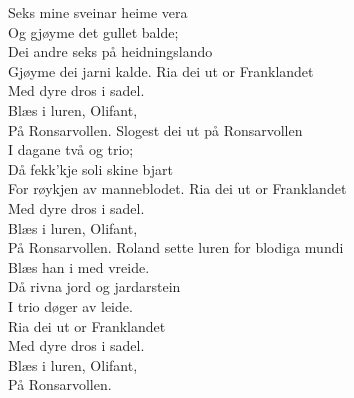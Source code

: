 
Seks mine sveinar heime vera\\
Og gjøyme det gullet balde;\\
Dei andre seks på heidningslando\\
Gjøyme dei jarni kalde.
\hops
{} Ria dei ut or Franklandet\\
 Med dyre dros i sadel.\\
 Blæs i luren, Olifant,\\
 På Ronsarvollen.
\hops
Slogest dei ut på Ronsarvollen\\
I dagane två og trio;\\
Då fekk'kje soli skine bjart\\
For røykjen av manneblodet.
\hops
{} Ria dei ut or Franklandet\\
 Med dyre dros i sadel.\\
 Blæs i luren, Olifant,\\
 På Ronsarvollen.
\hops
Roland sette luren for blodiga mundi\\
Blæs han i med vreide.\\
Då rivna jord og jardarstein\\
I trio døger av leide.\\
\hops
{} Ria dei ut or Franklandet\\
 Med dyre dros i sadel.\\
 Blæs i luren, Olifant,\\
 På Ronsarvollen.